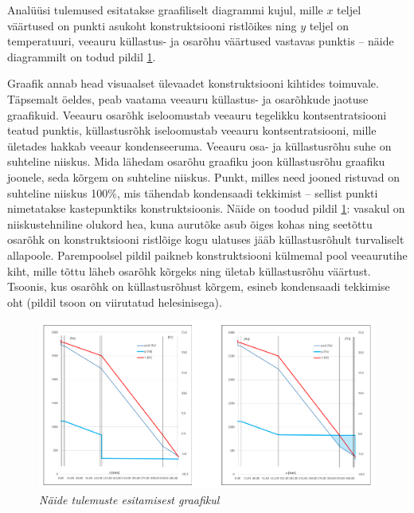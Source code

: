 Analüüsi tulemused esitatakse graafiliselt diagrammi kujul, mille \begin{math}x\end{math} teljel väärtused on 
punkti asukoht konstruktsiooni ristlõikes ning \begin{math}y\end{math} teljel on temperatuuri, veeauru küllastus- ja
osarõhu väärtused vastavas punktis -- näide diagrammilt on todud pildil  \ref{fig:excel_graph_sample}.

Graafik annab head visuaalset ülevaadet konstruktsiooni kihtides toimuvale. Täpsemalt öeldes, peab vaatama 
veeauru küllastus- ja osarõhkude jaotuse graafikuid. Veeauru osarõhk iseloomustab veeauru tegelikku kontsentratsiooni
teatud punktis, küllastusrõhk iseloomustab veeauru kontsentratsiooni, mille ületades hakkab veeaur kondenseeruma.
Veeauru osa- ja küllastusrõhu suhe on suhteline niiskus. Mida lähedam osarõhu graafiku joon küllastusrõhu graafiku 
joonele, seda kõrgem on suhteline niiskus. Punkt, milles need jooned ristuvad on suhteline niiskus 100\%, mis 
tähendab kondensaadi tekkimist -- sellist punkti nimetatakse kastepunktiks konstruktsioonis.
Näide on toodud pildil \ref{fig:excel_graph_sample}: vasakul on niiskustehniline olukord hea, kuna aurutõke asub õiges 
kohas ning seetõttu osarõhk on konstruktsiooni ristlõige kogu ulatuses jääb küllastusrõhult turvaliselt allapoole.
Parempoolsel pildil paikneb konstruktsiooni külmemal pool veeaurutihe kiht, mille tõttu läheb osarõhk kõrgeks ning 
ületab küllastusrõhu väärtust. Tsoonis, kus osarõhk on küllastusrõhust kõrgem, esineb kondensaadi tekkimise oht (pildil
tsoon on viirutatud helesinisega).

\begin{figure}[ht]
    \centering
    \includegraphics[width=.8\textwidth]{figures/problem_statement/05_excel_grafic_sample.png}
    \caption[Näide niiskustehnilise analüüsi tulemuste esitamisest graafikul]{\textit{Näide tulemuste esitamisest graafikul}}
    \label{fig:excel_graph_sample}
\end{figure}

